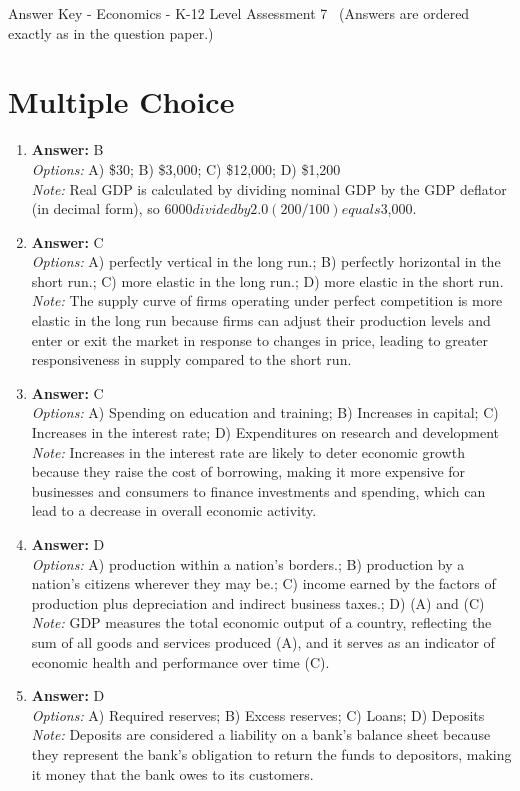 \documentclass[12pt]{article}
\begin{document}
\begin{center}
Answer Key - Economics - K-12 Level Assessment 7 \
\small (Answers are ordered exactly as in the question paper.)
\end{center}

\section*{Multiple Choice}
\begin{enumerate}[label=\arabic*.]
\item \textbf{Answer:} B
\\ \textit{Options:} A) \$30; B) \$3,000; C) \$12,000; D) \$1,200
\\ \textit{Note:} Real GDP is calculated by dividing nominal GDP by the GDP deflator (in decimal form), so $6000 divided by 2.0 (200/100) equals $3,000.
\item \textbf{Answer:} C
\\ \textit{Options:} A) perfectly vertical in the long run.; B) perfectly horizontal in the short run.; C) more elastic in the long run.; D) more elastic in the short run.
\\ \textit{Note:} The supply curve of firms operating under perfect competition is more elastic in the long run because firms can adjust their production levels and enter or exit the market in response to changes in price, leading to greater responsiveness in supply compared to the short run.
\item \textbf{Answer:} C
\\ \textit{Options:} A) Spending on education and training; B) Increases in capital; C) Increases in the interest rate; D) Expenditures on research and development
\\ \textit{Note:} Increases in the interest rate are likely to deter economic growth because they raise the cost of borrowing, making it more expensive for businesses and consumers to finance investments and spending, which can lead to a decrease in overall economic activity.
\item \textbf{Answer:} D
\\ \textit{Options:} A) production within a nation's borders.; B) production by a nation's citizens wherever they may be.; C) income earned by the factors of production plus depreciation and indirect business taxes.; D) (A) and (C)
\\ \textit{Note:} GDP measures the total economic output of a country, reflecting the sum of all goods and services produced (A), and it serves as an indicator of economic health and performance over time (C).
\item \textbf{Answer:} D
\\ \textit{Options:} A) Required reserves; B) Excess reserves; C) Loans; D) Deposits
\\ \textit{Note:} Deposits are considered a liability on a bank's balance sheet because they represent the bank's obligation to return the funds to depositors, making it money that the bank owes to its customers.
\end{enumerate}
\end{document}
